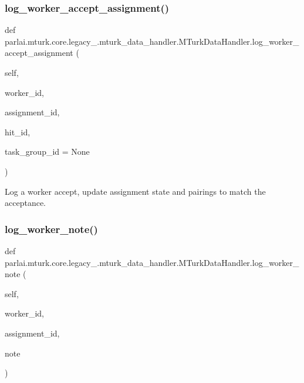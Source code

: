 \subsubsection{\texorpdfstring{log\+\_\+worker\+\_\+accept\+\_\+assignment()}{log\_worker\_accept\_assignment()}}
{\footnotesize\ttfamily def parlai.\+mturk.\+core.\+legacy\+\_.\+mturk\+\_\+data\+\_\+handler.\+M\+Turk\+Data\+Handler.\+log\+\_\+worker\+\_\+accept\+\_\+assignment (\begin{DoxyParamCaption}\item[{}]{self,  }\item[{}]{worker\+\_\+id,  }\item[{}]{assignment\+\_\+id,  }\item[{}]{hit\+\_\+id,  }\item[{}]{task\+\_\+group\+\_\+id = {\ttfamily None} }\end{DoxyParamCaption})}

\begin{DoxyVerb}Log a worker accept, update assignment state and pairings to match the
acceptance.
\end{DoxyVerb}
 \mbox{\label{classparlai_1_1mturk_1_1core_1_1legacy__2018_1_1mturk__data__handler_1_1MTurkDataHandler_a41f11b100a6afe3b51496882d0df7c58}} 
\subsubsection{\texorpdfstring{log\+\_\+worker\+\_\+note()}{log\_worker\_note()}}
{\footnotesize\ttfamily def parlai.\+mturk.\+core.\+legacy\+\_.\+mturk\+\_\+data\+\_\+handler.\+M\+Turk\+Data\+Handler.\+log\+\_\+worker\+\_\+note (\begin{DoxyParamCaption}\item[{}]{self,  }\item[{}]{worker\+\_\+id,  }\item[{}]{assignment\+\_\+id,  }\item[{}]{note }\end{DoxyParamCaption})}

